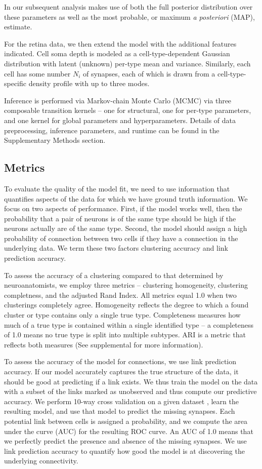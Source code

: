 \documentclass{article}
\begin{document}
In our subsequent analysis makes use of both the full posterior
distribution over these parameters as well as the most probable, or
maximum \textit{a posteriori} (MAP), estimate.


For the retina data, we then extend the model with the additional
features indicated. Cell soma depth is modeled as a
cell-type-dependent Gaussian distribution with latent (unknown)
per-type mean and variance. Similarly, each cell has some number $N_i$
of synapses, each of which is drawn from a cell-type-specific density
profile with up to three modes.

Inference is performed via Markov-chain Monte Carlo (MCMC) via three
composable transition kernels -- one for structural, one for per-type
parameters, and one kernel for global parameters and
hyperparameters. Details of data preprocessing, inference parameters,
and runtime can be found in the Supplementary Methods section.


\subsection*{Metrics}
To evaluate the quality of the model fit, we need to use information
that quantifies aspects of the data for which we have ground truth
information. We focus on two aspects of performance. First, if the
model works well, then the probability that a pair of neurons is of
the same type should be high if the neurons actually are of the same
type. Second, the model should assign a high probability of connection
between two cells if they have a connection in the underlying data. We
term these two factors clustering accuracy and link prediction
accuracy.

To assess the accuracy of a clustering compared to that determined by
neuroanatomists, we employ three metrics -- clustering homogeneity,
clustering completness, and the adjusted Rand Index. All metrics equal
1.0 when two clusterings completely agree. Homogeneity reflects the
degree to which a found cluster or type contains only a single true
type. Completeness measures how much of a true type is contained
within a single identified type -- a completeness of 1.0 means no true
type is split into multiple subtypes. ARI is a metric that reflects both measures (See
supplemental for more information). 

To assess the accuracy of the model for connections, we use link
prediction accuracy. If our model accurately captures the true
structure of the data, it should be good at predicting if a link
exists.  We thus train the model on the data with a subset of the
links marked as unobserved and thus compute our predictive
accuracy. We perform 10-way cross validation on a given dataset \autocite{Guerra2011}, learn
the resulting model, and use that model to predict the missing
synapses. Each potential link between cells is assigned a probability,
and we compute the area under the curve (AUC) for the resulting ROC
curve. An AUC of 1.0 means that we perfectly predict the presence and
absence of the missing synapses. We use link prediction accuracy to
quantify how good the model is at discovering the underlying
connectivity.  
\end{document}
